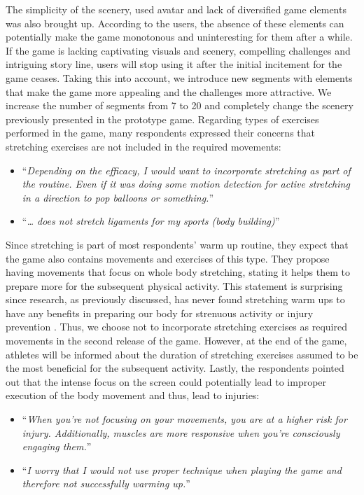 The simplicity of the scenery, used avatar and lack of diversified game elements was also brought up. According to the users, the absence of these elements can potentially make the game monotonous and uninteresting for them after a while. If the game is lacking captivating visuals and scenery, compelling challenges and intriguing story line, users will stop using it after the initial incitement for the game ceases. Taking this into account, we introduce new segments with elements that make the game more appealing and the challenges more attractive. We increase the number of segments from 7 to 20 and completely change the scenery previously presented in the prototype game. Regarding types of exercises performed in the game, many respondents expressed their concerns that stretching exercises are not included in the required movements: 
\begin{itemize}
\item ``\textit{Depending on the efficacy, I would want to incorporate stretching as part of the routine. Even if it was doing some motion detection for active stretching in a direction to pop balloons or something.}''
\item ``\textit{… does not stretch ligaments for my sports (body building)}''
\end{itemize}
Since stretching is part of most respondents' warm up routine, they expect that the game also contains movements and exercises of this type. They propose having movements that focus on whole body stretching, stating it helps them to prepare more for the subsequent physical activity. This statement is surprising since research, as previously discussed,  has never found stretching warm ups to have any benefits in preparing our body for strenuous activity or injury prevention \cite{pereles2012large}. Thus, we choose not to incorporate stretching exercises as required movements in the second release of the game. However, at the end of the game, athletes will be informed about the duration of stretching exercises assumed to be the most beneficial for the subsequent activity. Lastly, the respondents pointed out that the intense focus on the screen could potentially lead to improper execution of the body movement and thus, lead to injuries:
\begin{itemize}
\item ``\textit{When you're not focusing on your movements, you are at a higher risk for injury. Additionally, muscles are more responsive when you're consciously engaging them.}''
\item ``\textit{I worry that I would not use proper technique when playing the game and therefore not successfully warming up.}''
\end{itemize}
